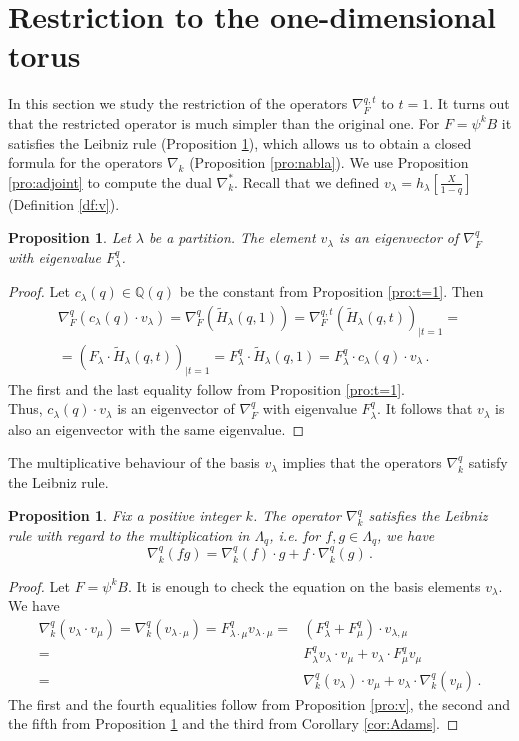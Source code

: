 \documentclass[12pt,a4paper]{amsart}
\theoremstyle{plain}
\newtheorem{pro}[tw]{Proposition}
\theoremstyle{definition}
\theoremstyle{remark}
\newcommand{\QQ}{\mathbb{Q}}
\begin{document}
\section{Restriction to the one-dimensional torus} \label{s:t=1}
\noindent In this section we study the restriction of the operators $\nabla^{q,t}_F$ to $t=1$. It turns out that the restricted operator is much simpler than the original one. For $F=\psi^kB$ it satisfies the Leibniz rule (Proposition \ref{pro:Leibniz}), which allows us to obtain a closed formula for the operators $\nabla_k$ (Proposition \ref{pro:nabla}). We use Proposition \ref{pro:adjoint} to compute the dual $\nabla^*_k$. Recall that we defined $v_\lambda = h_{\lambda}\left[\frac{X}{1-q}\right] $ (Definition \ref{df:v}).
\begin{pro}
	\label{pro:eigen}
	Let $\lambda$ be a partition. The element $v_\lambda$ is an eigenvector of $\nabla^q_F$ with eigenvalue $F^q_\lambda$.
\end{pro}
\begin{proof}
	Let $c_\lambda(q) \in \QQ(q)$ be the constant from Proposition \ref{pro:t=1}. Then
	\begin{multline*}
		\nabla^q_F(c_\lambda(q)\cdot v_\lambda)=
		\nabla^q_F(\tilde{H}_\lambda(q,1))=
		\nabla^{q,t}_F(\tilde{H}_\lambda(q,t))_{|t=1}= \\ =
		(F_\lambda\cdot\tilde{H}_\lambda(q,t))_{|t=1}=
		F^q_\lambda\cdot \tilde{H}_\lambda(q,1)=
		F^q_\lambda\cdot c_\lambda(q)\cdot v_\lambda\,.
	\end{multline*}
	The first and the last equality follow from Proposition \ref{pro:t=1}. \\
	Thus, $c_\lambda(q)\cdot v_\lambda$ is an eigenvector of $\nabla^q_F$ with eigenvalue  $F^q_\lambda$. It follows that $v_\lambda$ is also an eigenvector with the same eigenvalue.
\end{proof}
\noindent The multiplicative behaviour of the basis $v_\lambda$ implies that the operators $\nabla_k^q$ satisfy the Leibniz rule.
\begin{pro} \label{pro:Leibniz}
	Fix a positive integer $k$. The operator $\nabla_k^{q}$ satisfies the Leibniz rule with regard to the multiplication in $\Lambda_q$, i.e. for $f,g\in \Lambda_q$, we have
	$$\nabla_k^{q}(fg)=\nabla_k^{q}(f)\cdot g+f\cdot\nabla_k^{q}(g)\,. $$
\end{pro}
\begin{proof}
	Let $F=\psi^kB$. It is enough to check the equation on the basis elements $v_\lambda$. We have 
	\begin{align*}
		\nabla_k^{q}(v_\lambda\cdot v_\mu)=
		\nabla_k^{q}(v_{\lambda\cdot\mu})=
		F^q_{\lambda\cdot\mu}v_{\lambda\cdot\mu}=&
		(F^q_{\lambda}+F^q_{\mu})\cdot v_{\lambda,\mu} \\
		=&F^q_{\lambda}v_\lambda\cdot v_\mu+v_\lambda\cdot F^q_{\mu}v_\mu \\
		=&\nabla_k^{q}(v_\lambda)\cdot v_\mu+ v_\lambda\cdot \nabla_k^{q}(v_\mu)\,.
	\end{align*}
	The first and the fourth equalities follow from Proposition \ref{pro:v}, the second and the fifth from Proposition \ref{pro:eigen} and the third from Corollary \ref{cor:Adams}.
\end{proof}
\end{document}
